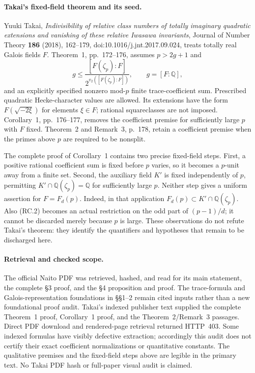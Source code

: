 \paragraph{Takai's fixed-field theorem and its seed.}
Yuuki Takai, \emph{Indivisibility of relative class numbers of totally
imaginary quadratic extensions and vanishing of these relative Iwasawa
invariants}, Journal of Number Theory \textbf{186} (2018), 162--179,
doi:10.1016/j.jnt.2017.09.024, treats totally real Galois fields $F$.
Theorem~1, pp.~172--176, assumes $p>2g+1$ and
\[
 g\leq \frac{[F(\zeta_p):F]}
                 {2^{v_2([F(\zeta_p):F])}},\qquad g=[F:\mathbb Q],
                                                               \tag{RC.2}
\]
and an explicitly specified nonzero mod-$p$ finite trace-coefficient
sum.  Prescribed quadratic Hecke-character values are allowed.  Its
extensions have the form $F(\sqrt{-2\xi})$ for elements $\xi\in F$;
rational squareclasses are not imposed.  Corollary~1, pp.~176--177,
removes the coefficient premise for sufficiently large $p$ with $F$
fixed.  Theorem~2 and Remark~3, p.~178, retain a coefficient premise
when the primes above $p$ are required to be nonsplit.

The complete proof of Corollary~1 contains two precise fixed-field
steps.  First, a positive rational coefficient sum is fixed before
$p$ varies, so it becomes a $p$-unit away from a finite set.  Second,
the auxiliary field $K'$ is fixed independently of $p$, permitting
$K'\cap\mathbb Q(\zeta_p)=\mathbb Q$ for sufficiently large $p$.
Neither step gives a uniform assertion for $F=F_d(p)$.  Indeed, in
that application $F_d(p)\subset K'\cap\mathbb Q(\zeta_p)$.
Also (RC.2) becomes an actual restriction on the odd part of
$(p-1)/d$; it cannot be discarded merely because $p$ is large.
These observations do not refute Takai's theorem: they identify the
quantifiers and hypotheses that remain to be discharged here.

\paragraph{Retrieval and checked scope.}
The official Naito PDF was retrieved, hashed, and read for its main
statement, the complete \S3 proof, and the \S4 proposition and proof.
The trace-formula and Galois-representation foundations in \S\S1--2
remain cited inputs rather than a new foundational proof audit.
Takai's indexed publisher text supplied the complete Theorem~1 proof,
Corollary~1 proof, and the Theorem~2/Remark~3 passages.  Direct PDF
download and rendered-page retrieval returned HTTP~403.  Some indexed
formulas have visibly defective extraction; accordingly this audit
does not certify their exact coefficient normalizations or quantitative
constants.  The qualitative premises and the fixed-field steps above
are legible in the primary text.  No Takai PDF hash or full-paper
visual audit is claimed.

